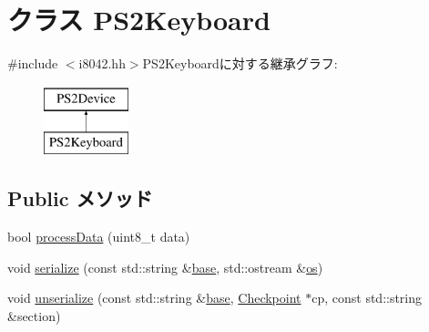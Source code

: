 \hypertarget{classX86ISA_1_1PS2Keyboard}{
\section{クラス PS2Keyboard}
\label{classX86ISA_1_1PS2Keyboard}
}


{\ttfamily \#include $<$i8042.hh$>$}PS2Keyboardに対する継承グラフ:\begin{figure}[H]
\begin{center}
\leavevmode
\includegraphics[height=2cm]{classX86ISA_1_1PS2Keyboard}
\end{center}
\end{figure}
\subsection*{Public メソッド}
\begin{DoxyCompactItemize}
\item 
bool \hyperlink{classX86ISA_1_1PS2Keyboard_a501fdeaf8d614f432cfbf95f23675982}{processData} (uint8\_\-t data)
\item 
void \hyperlink{classX86ISA_1_1PS2Keyboard_ab4138b21b48e3371a8e20df72b675a88}{serialize} (const std::string \&\hyperlink{namespaceX86ISA_a22fd87812cbb48f6d80b6cc7957490cf}{base}, std::ostream \&\hyperlink{namespaceX86ISA_a6b6e6ba763e7eaf46ac5b6372ca98d30}{os})
\item 
void \hyperlink{classX86ISA_1_1PS2Keyboard_a147c320e3d6506edf5587a40cd8e430d}{unserialize} (const std::string \&\hyperlink{namespaceX86ISA_a22fd87812cbb48f6d80b6cc7957490cf}{base}, \hyperlink{classCheckpoint}{Checkpoint} $\ast$cp, const std::string \&section)
\end{DoxyCompactItemize}
